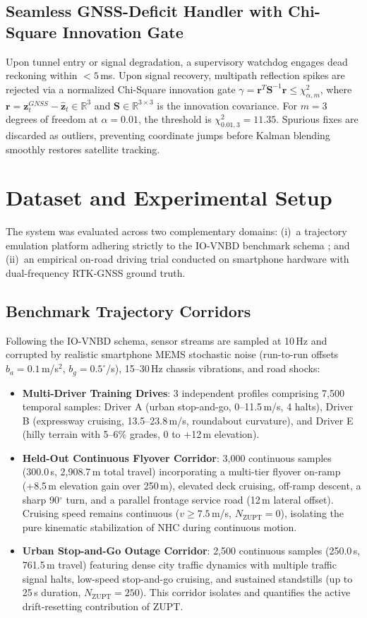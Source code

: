 \documentclass[conference]{IEEEtran}
\begin{document}
\subsection{Seamless GNSS-Deficit Handler with Chi-Square Innovation Gate}
Upon tunnel entry or signal degradation, a supervisory watchdog engages dead reckoning within $<5$\,ms. Upon signal recovery, multipath reflection spikes are rejected via a normalized Chi-Square innovation gate $\gamma = \mathbf{r}^T\mathbf{S}^{-1}\mathbf{r} \leq \chi^2_{\alpha,m}$, where $\mathbf{r} = \mathbf{z}_t^{GNSS} - \hat{\mathbf{z}}_t \in \mathbb{R}^3$ and $\mathbf{S} \in \mathbb{R}^{3\times 3}$ is the innovation covariance. For $m=3$ degrees of freedom at $\alpha = 0.01$, the threshold is $\chi^2_{0.01, 3} = 11.35$. Spurious fixes are discarded as outliers, preventing coordinate jumps before Kalman blending smoothly restores satellite tracking.

\section{Dataset and Experimental Setup}

The system was evaluated across two complementary domains: (i)~a trajectory emulation platform adhering strictly to the IO-VNBD benchmark schema \cite{onyekpe2021}; and (ii)~an empirical on-road driving trial conducted on smartphone hardware with dual-frequency RTK-GNSS ground truth.

\subsection{Benchmark Trajectory Corridors}
Following the IO-VNBD schema, sensor streams are sampled at 10\,Hz and corrupted by realistic smartphone MEMS stochastic noise (run-to-run offsets $b_a = 0.1$\,m/s$^2$, $b_g = 0.5^\circ$/s), 15--30\,Hz chassis vibrations, and road shocks:
\begin{itemize}
\item \textbf{Multi-Driver Training Drives}: 3 independent profiles comprising 7,500 temporal samples: Driver A (urban stop-and-go, 0--11.5\,m/s, 4 halts), Driver B (expressway cruising, 13.5--23.8\,m/s, roundabout curvature), and Driver E (hilly terrain with 5--6\% grades, 0 to +12\,m elevation).
\item \textbf{Held-Out Continuous Flyover Corridor}: 3,000 continuous samples (300.0\,s, 2{,}908.7\,m total travel) incorporating a multi-tier flyover on-ramp (+8.5\,m elevation gain over 250\,m), elevated deck cruising, off-ramp descent, a sharp 90$^\circ$ turn, and a parallel frontage service road (12\,m lateral offset). Cruising speed remains continuous ($v \ge 7.5$\,m/s, $N_{\text{ZUPT}}=0$), isolating the pure kinematic stabilization of NHC during continuous motion.
\item \textbf{Urban Stop-and-Go Outage Corridor}: 2,500 continuous samples (250.0\,s, 761.5\,m travel) featuring dense city traffic dynamics with multiple traffic signal halts, low-speed stop-and-go cruising, and sustained standstills (up to 25\,s duration, $N_{\text{ZUPT}}=250$). This corridor isolates and quantifies the active drift-resetting contribution of ZUPT.
\end{itemize}
\end{document}
